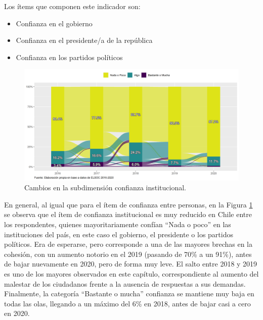 \documentclass[
  12pt,
]{book}
\begin{document}
Los ítems que componen este indicador son:

\begin{itemize}
\item
  Confianza en el gobierno
\item
  Confianza en el presidente/a de la república
\item
  Confianza en los partidos políticos
\end{itemize}

\begin{figure}[H]

{\centering \includegraphics[width=1\linewidth,height=1\textheight]{output/graphs/alluvial_conf_institucional} 

}

\caption{Cambios en la subdimensión confianza institucional.}\label{fig:alluvial-conf-institucional}
\end{figure}

En general, al igual que para el ítem de confianza entre personas, en la Figura \ref{fig:alluvial-conf-institucional} se observa que el ítem de confianza institucional es muy reducido en Chile entre los respondentes, quienes mayoritariamente confían ``Nada o poco'' en las instituciones del país, en este caso el gobierno, el presidente o los partidos políticos. Era de esperarse, pero corresponde a una de las mayores brechas en la cohesión, con un aumento notorio en el 2019 (pasando de 70\% a un 91\%), antes de bajar nuevamente en 2020, pero de forma muy leve. El salto entre 2018 y 2019 es uno de los mayores observados en este capítulo, correspondiente al aumento del malestar de los ciudadanos frente a la ausencia de respuestas a sus demandas. Finalmente, la categoría ``Bastante o mucha'' confianza se mantiene muy baja en todas las olas, llegando a un máximo del 6\% en 2018, antes de bajar casi a cero en 2020.
\end{document}
